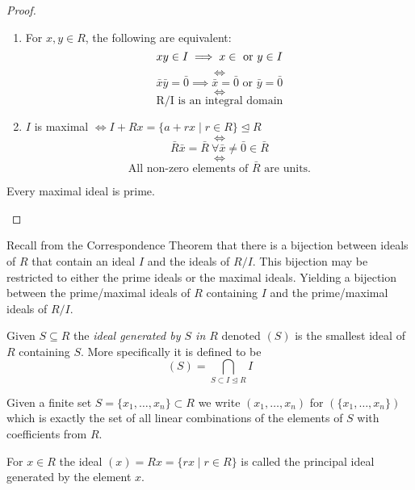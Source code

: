 \documentclass[master.tex]{subfiles}
\begin{document}
\begin{proof}
  \begin{enumerate}[label=(\alph*)]
  \item For \(x,y \in R\), the following are equivalent:
    \[xy \in I \implies x \in \text{ or } y \in I\\\] \[\iff\]
    \[\bar{x}\bar{y}=\bar{0} \implies \bar{x}=\bar{0} \text{ or } \bar{y}=\bar{0}\] \[\iff\] \[\text{R/I is an
        integral domain}\]
  \item \(I\) is maximal \(\iff I + Rx = \{a+rx \mid r \in R\} \unlhd R\)
    \[\iff\]
    \[\bar{R}\bar{x}=\bar{R} \ \forall \bar{x} \neq \bar{0} \in \bar{R}\]
    \[\iff\]
    \[\text{All non-zero elements of \(\bar{R}\) are units.}\]
  \end{enumerate}

  \begin{cor*}
    Every maximal ideal is prime.
  \end{cor*}
\end{proof}

\begin{rmk}
  Recall from the Correspondence Theorem that there is a bijection between ideals of \(R\) that contain an ideal \(I\)
  and the ideals of \(R/I\). This bijection may be restricted to either the prime ideals or the maximal ideals. Yielding
  a bijection between the prime/maximal ideals of \(R\) containing \(I\) and the prime/maximal ideals of \(R/I\).
\end{rmk}

\begin{defn*}
  Given \(S \subseteq R\) the \emph{ideal generated by \(S\) in \(R\)} denoted \((S)\) is the smallest ideal of \(R\)
  containing \(S\). More specifically it is defined to be
  \[(S)=\bigcap_{S \subset I \unlhd R} I\]
\end{defn*}

\begin{notation}
  Given a finite set \(S=\{x_1,\ldots,x_n\} \subset R\) we write \((x_1,\ldots,x_n)\) for
  \(\left(\{x_1,\ldots,x_n\}\right)\) which is exactly the set of all linear combinations of the elements of \(S\) with
  coefficients from \(R\).
\end{notation}

\begin{defn*}
  For \(x \in R\) the ideal \((x)=Rx=\{rx \mid r \in R\}\) is called the principal ideal generated by the element \(x\).
\end{defn*}
\end{document}
